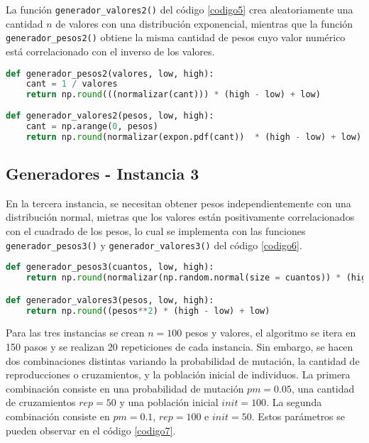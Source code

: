 \documentclass{article}
\begin{document}
La funci\'on \texttt{generador\_valores2()} del c\'odigo \ref{codigo5} crea aleatoriamente una cantidad $n$ de valores con una distribuci\'on exponencial, mientras que la funci\'on \texttt{generador\_pesos2()} obtiene la misma cantidad de pesos cuyo valor num\'erico est\'a correlacionado con el inverso de los valores.

\newpage

\begin{lstlisting}[caption={Generadores de Pesos y Valores de Instancia 2}, label=codigo5, language=Python]
def generador_pesos2(valores, low, high):
    cant = 1 / valores
    return np.round(((normalizar(cant))) * (high - low) + low)
 
def generador_valores2(pesos, low, high):
    cant = np.arange(0, pesos)  
    return np.round(normalizar(expon.pdf(cant))  * (high - low) + low)
\end{lstlisting}

\subsection{Generadores - Instancia 3}

En la tercera instancia, se necesitan obtener pesos independientemente con una distribuci\'on normal, mietras que los valores est\'an positivamente correlacionados con el cuadrado de los pesos, lo cual se implementa con las funciones \texttt{generador\_pesos3()} y \texttt{generador\_valores3()} del c\'odigo \ref{codigo6}.

\begin{lstlisting}[caption={Generadores de Pesos y Valores de Instancia 3}, label=codigo6, language=Python]
def generador_pesos3(cuantos, low, high):
    return np.round(normalizar(np.random.normal(size = cuantos)) * (high - low) + low)

def generador_valores3(pesos, low, high):
    return np.round((pesos**2) * (high - low) + low)
\end{lstlisting}

\newblock

Para las tres instancias se crean $n=100$ pesos y valores, el algoritmo se itera en 150 pasos y se realizan 20 repeticiones de cada instancia. Sin embargo, se hacen dos combinaciones distintas variando la probabilidad de mutaci\'on, la cantidad de reproducciones o cruzamientos, y la poblaci\'on inicial de individuos. La primera combinaci\'on consiste en una probabilidad de mutaci\'on $pm=0.05$, una cantidad de cruzamientos $rep=50$ y una poblaci\'on inicial $init=100$. La segunda combinaci\'on consiste en $pm=0.1$, $rep=100$ e $init=50$. Estos par\'ametros se pueden observar en el c\'odigo \ref{codigo7}.
\end{document}
